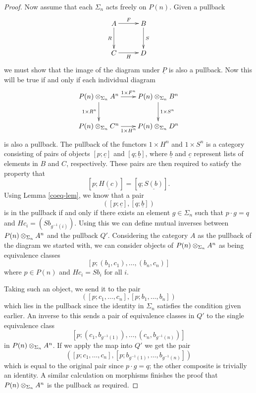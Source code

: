 \begin{proof}
Now assume that each $\Sigma_n$ acts freely on $P(n)$. Given a pullback
    \[
        \xy
            (0,0)*+{A}="00";
            (15,0)*+{B}="10";
            (0,-15)*+{C}="01";
            (15,-15)*+{D}="11";
            {\ar^{F} "00" ; "10"};
            {\ar^{S} "10" ; "11"};
            {\ar_{R} "00" ; "01"};
            {\ar_{H} "01" ; "11"};
        \endxy
    \]
we must show that the image of the diagram under $\underline{P}$ is also a pullback. Now this will be true if and only if each individual diagram
        \[
            \xy
                (0,0)*+{\coeqsig{P}{A}{n}}="00";
                (30,0)*+{\coeqsig{P}{B}{n}}="10";
                (0,-15)*+{\coeqsig{P}{C}{n}}="01";
                (30,-15)*+{\coeqsig{P}{D}{n}}="11";
                {\ar^{1 \times F^n} "00" ; "10"};
                {\ar^{1 \times S^n} "10" ; "11"};
                {\ar_{1 \times R^n} "00" ; "01"};
                {\ar_{1 \times H^n} "01" ; "11"}:
            \endxy
    \]
is also a pullback. The pullback of the functors $1 \times H^n$ and $1 \times S^n$ is a category consisting of pairs of objects $[p;\underline{c}]$ and $[q;\underline{b}]$, where $\underline{b}$ and $\underline{c}$ represent lists of elements in $B$ and $C$, respectively. These pairs are then required to satisfy the property that
    \[
        \left[p;\underline{H(c)}\right] = \left[q; \underline{S(b)}\right].
    \]
Using Lemma \ref{coeq-lem}, we know that a pair
    \[
        \left(\left[p;\underline{c}\right], \left[q;\underline{b}\right]\right)
    \]
is in the pullback if and only if there exists an element $g \in \Sigma_n$ such that $p \cdot g = q$ and $Hc_i = (Sb_{g^{-1}(i)})$. Using this we can define mutual inverses between $P(n) \otimes_{\Sigma_n} A^n$ and the pullback $Q'$. Considering the category $A$ as the pullback of the diagram we started with, we can consider objects of $P(n) \otimes_{\Sigma_n} A^n$ as being equivalence classes
    \[
        [p;(b_1,c_1),\ldots,(b_n,c_n)]
    \]
where $p \in P(n)$ and $Hc_i = Sb_i$ for all $i$.

Taking such an object, we send it to the pair
    \[
        \left(\left[p;c_1,\ldots,c_n\right],[p;b_1,\ldots,b_n]\right)
    \]
which lies in the pullback since the identity in $\Sigma_n$ satisfies the condition given earlier. An inverse to this sends a pair of equivalence classes in $Q'$ to the single equivalence class
    \[
        \left[p;\left(c_1,b_{g^{-1}(1)}\right),\ldots,\left(c_n,b_{g^{-1}(n)}\right)\right]
    \]
in $P(n) \otimes_{\Sigma_n} A^n$. If we apply the map into $Q'$ we get the pair
    \[
        \left(\left[p;c_1,\ldots,c_n\right],\left[p;b_{g^{-1}(1)},\ldots,b_{g^{-1}(n)}\right]\right)
    \]
which is equal to the original pair since $p \cdot g = q$; the other composite is trivially an identity. A similar calculation on morphisms finishes the proof that $P(n) \otimes_{\Sigma_n} A^n$ is the pullback as required.
\end{proof}

